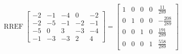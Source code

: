\begin{exerciseAnswer} 


\[\operatorname{RREF} \left[\begin{array}{ccccc}
-2 & -1 & -4 & 0 & -2 \\
-2 & -5 & -1 & -2 & -1 \\
-5 & 0 & 3 & -3 & -4 \\
-1 & -3 & -3 & 2 & 4
\end{array}\right] = \left[\begin{array}{ccccc}
1 & 0 & 0 & 0 & \frac{11}{289} \\
0 & 1 & 0 & 0 & -\frac{208}{289} \\
0 & 0 & 1 & 0 & \frac{191}{289} \\
0 & 0 & 0 & 1 & \frac{558}{289}
\end{array}\right] \]



\end{exerciseAnswer}
